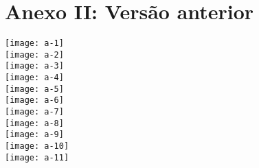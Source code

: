 \documentclass[10pt]{article}
\begin{document}
\section{Anexo II: Versão anterior}
\label{sec:anexo-i:-versao-anterior}

\texttt{[image: a-1]} \linebreak \\

\texttt{[image: a-2]} \linebreak \\
\texttt{[image: a-3]} \linebreak \\
\texttt{[image: a-4]} \linebreak \\
\texttt{[image: a-5]} \linebreak \\
\texttt{[image: a-6]} \linebreak \\
\texttt{[image: a-7]} \linebreak \\
\texttt{[image: a-8]} \linebreak \\
\texttt{[image: a-9]} \linebreak \\
\texttt{[image: a-10]} \linebreak \\
\texttt{[image: a-11]} \linebreak \\
\end{document}
